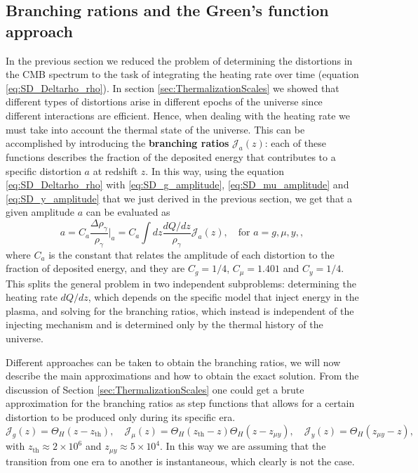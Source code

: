 \subsection{Branching rations and the Green's function approach}
In the previous section we reduced the problem of determining the distortions in the CMB spectrum to the task of integrating the heating rate over time (equation \eqref{eq:SD_Deltarho_rho}). In section \ref{sec:ThermalizationScales} we showed that different types of distortions arise in different epochs of the universe since different interactions are efficient. Hence, when dealing with the heating rate we must take into account the thermal state of the universe. This can be accomplished by introducing the \textbf{branching ratios} $\mathcal{J}_a(z)$: each of these functions describes the fraction of the deposited energy that contributes to a specific distortion $a$ at redshift $z$. In this way, using the equation \eqref{eq:SD_Deltarho_rho} with \eqref{eq:SD_g_amplitude}, \eqref{eq:SD_mu_amplitude} and \eqref{eq:SD_y_amplitude} that we just derived in the previous section, we get that a given amplitude $a$ can be evaluated as
\begin{equation}
    a=C_a\frac{\Delta\rho_\gamma}{\rho_\gamma}\bigg|_a=C_a\int dz\frac{dQ/dz}{\rho_\gamma}\mathcal{J}_a(z),\quad\text{for } a=g,\mu,y,\label{eq:SD_amplitude_branching},
\end{equation}
where $C_a$ is the constant that relates the amplitude of each distortion to the fraction of deposited energy, and they are $C_g=1/4$, $C_\mu=1.401$ and $C_y=1/4$.\\
This splits the general problem in two independent subproblems: determining the heating rate $d Q/dz$, which depends on the specific model that inject energy in the plasma, and solving for the branching ratios, which instead is independent of the injecting mechanism and is determined only by the thermal history of the universe.

Different approaches can be taken to obtain the branching ratios, we will now describe the main approximations and how to obtain the exact solution. From the discussion of Section \ref{sec:ThermalizationScales} one could get a brute approximation for the branching ratios as step functions that allows for a certain distortion to be produced only during its specific era.
\begin{equation}
    \mathcal{J}_g(z)=\Theta_{H}(z-z_\text{th}),\quad \mathcal{J}_\mu(z)=\Theta_{H}(z_\text{th}-z)\Theta_{H}(z-z_{\mu y}),\quad \mathcal{J}_y(z)=\Theta_{H}(z_{\mu y}-z),
\end{equation}
with $z_\text{th}\approx2\times10^6$ and $z_{\mu y}\approx5\times10^4$.
In this way we are assuming that the transition from one era to another is instantaneous, which clearly is not the case. 

